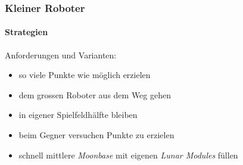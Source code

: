 \begin{frame}
	\frametitle{Kleiner Roboter}
	\framesubtitle{Strategien}
	Anforderungen und Varianten:
	\begin{itemize}
		\item so viele Punkte wie möglich erzielen
		\item dem grossen Roboter aus dem Weg gehen
	\end{itemize}
	\begin{itemize}
		\item in eigener Spielfeldhälfte bleiben
		\item beim Gegner versuchen Punkte zu erzielen
		\item schnell mittlere \textit{Moonbase} mit eigenen \textit{Lunar Modules} füllen
	\end{itemize}
	
\end{frame}
